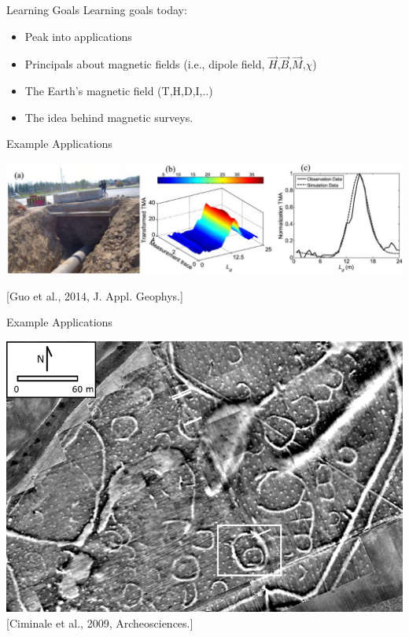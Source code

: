 \begin{frame}
    \begin{PointSix}{Learning Goals}
      \alert{Learning goals today:}
      \begin{itemize}
        \item Peak into applications
        \item Principals about magnetic fields (i.e., dipole field, $\vec{H}$,$\vec{B}$,$\vec{M}$,$\chi$)
        \item The Earth's magnetic field (T,H,D,I,..)
        \item The idea behind magnetic surveys.
      \end{itemize}
    \end{PointSix}
\end{frame}



\begin{frame}
  \begin{PointSix}{Example Applications}
    
    \includegraphics[width=\linewidth]{Figures/Magnetics/Pipeline_Guoetal2014_JApplPhysics.png}
  
    \tiny [Guo et al., 2014, J. Appl. Geophys.]
  \end{PointSix}
\end{frame}

\begin{frame}
  \begin{PointSix}{Example Applications}
    
    \includegraphics[width=\linewidth]{Figures/Magnetics/Archeology_CiminaleEtAl_2009_ArcheoSciences.jpg}
    \tiny [Ciminale et al., 2009, Archeosciences.]
  \end{PointSix}
\end{frame}

